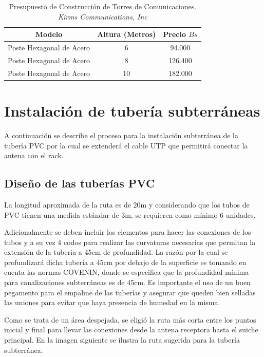 \documentclass[11pt, a4paper, twosides]{report}
\begin{document}
\begin{table}[h]
    \centering
    \begin{tabular}{|c|c|c|}
        \hline
       \cellcolor{gray75} \textbf{Modelo} & \cellcolor{gray75}\textbf{Altura (Metros)} & \cellcolor{gray75}\textbf{Precio $Bs$} \\ \hline
        Poste Hexagonal de Acero & 6 & 94.000 \\ \hline
        Poste Hexagonal de Acero & 8 & 126.400  \\ \hline
        Poste Hexagonal de Acero & 10 & 182.000  \\ \hline
    \end{tabular}
    \caption{Presupuesto de Construcción de Torres de Comunicaciones.
     \textit{Kirms Communications, Inc}}
     \label{tab:costorre}
\end{table}

\section{Instalación de tubería subterráneas}
 A continuación se describe el proceso para la instalación subterránea de la tubería PVC por la cual se extenderá el cable UTP que permitirá conectar la antena con el rack.
 
\subsection{Diseño de las tuberías PVC}
La longitud aproximada de la ruta es de 20m y considerando que los tubos de PVC tienen una medida estándar de 3m, se requieren como mínimo 6 unidades.
 
Adicionalmente se deben incluir los elementos para hacer las conexiones de los tubos y a su vez 4 codos para realizar las curvaturas necesarias que permitan la extensión de la tubería a 45cm de profundidad. La razón por la cual se profundizará dicha tubería a 45cm por debajo de la superficie es tomando en cuenta las normas COVENIN, donde se especifica que la profundidad mínima para canalizaciones subterráneas es de 45cm. Es importante el uso de un buen pegamento para el empalme de las tuberías y asegurar que queden bien selladas las uniones para evitar que haya presencia de humedad en la misma.

 Como se trata de un área despejada, se eligió la ruta más corta entre los puntos inicial y final para llevar las conexiones desde la antena receptora hasta el suiche principal. En la imagen siguiente se ilustra la ruta sugerida para la tubería subterránea.
\end{document}
